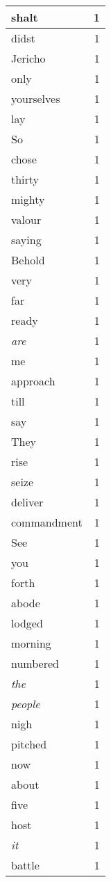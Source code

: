 \begin{center}
\begin{longtable}{l|r}
shalt & 1\\ \hline 
didst & 1\\ \hline 
Jericho & 1\\ \hline 
only & 1\\ \hline 
yourselves & 1\\ \hline 
lay & 1\\ \hline 
So & 1\\ \hline 
chose & 1\\ \hline 
thirty & 1\\ \hline 
mighty & 1\\ \hline 
valour & 1\\ \hline 
saying & 1\\ \hline 
Behold & 1\\ \hline 
very & 1\\ \hline 
far & 1\\ \hline 
ready & 1\\ \hline 
\emph{are} & 1\\ \hline 
me & 1\\ \hline 
approach & 1\\ \hline 
till & 1\\ \hline 
say & 1\\ \hline 
They & 1\\ \hline 
rise & 1\\ \hline 
seize & 1\\ \hline 
deliver & 1\\ \hline 
commandment & 1\\ \hline 
See & 1\\ \hline 
you & 1\\ \hline 
forth & 1\\ \hline 
abode & 1\\ \hline 
lodged & 1\\ \hline 
morning & 1\\ \hline 
numbered & 1\\ \hline 
\emph{the} & 1\\ \hline 
\emph{people} & 1\\ \hline 
nigh & 1\\ \hline 
pitched & 1\\ \hline 
now & 1\\ \hline 
about & 1\\ \hline 
five & 1\\ \hline 
host & 1\\ \hline 
\emph{it} & 1\\ \hline 
battle & 1\\ \hline 

\end{longtable}
\end{center}

